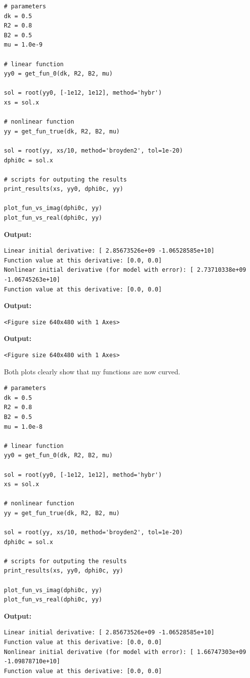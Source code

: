 \documentclass{article}
\begin{document}
\begin{lstlisting}
# parameters
dk = 0.5
R2 = 0.8
B2 = 0.5
mu = 1.0e-9

# linear function
yy0 = get_fun_0(dk, R2, B2, mu)

sol = root(yy0, [-1e12, 1e12], method='hybr')
xs = sol.x

# nonlinear function
yy = get_fun_true(dk, R2, B2, mu)

sol = root(yy, xs/10, method='broyden2', tol=1e-20)
dphi0c = sol.x

# scripts for outputing the results
print_results(xs, yy0, dphi0c, yy)

plot_fun_vs_imag(dphi0c, yy)
plot_fun_vs_real(dphi0c, yy)\end{lstlisting}

\textbf{Output:}\begin{verbatim}
Linear initial derivative: [ 2.85673526e+09 -1.06528585e+10]
Function value at this derivative: [0.0, 0.0]
Nonlinear initial derivative (for model with error): [ 2.73710338e+09 -1.06745263e+10]
Function value at this derivative: [0.0, 0.0]

\end{verbatim}

\textbf{Output:}\begin{verbatim}
<Figure size 640x480 with 1 Axes>
\end{verbatim}

\textbf{Output:}\begin{verbatim}
<Figure size 640x480 with 1 Axes>
\end{verbatim}

Both plots clearly show that my functions are now curved.

\begin{lstlisting}
# parameters
dk = 0.5
R2 = 0.8
B2 = 0.5
mu = 1.0e-8

# linear function
yy0 = get_fun_0(dk, R2, B2, mu)

sol = root(yy0, [-1e12, 1e12], method='hybr')
xs = sol.x

# nonlinear function
yy = get_fun_true(dk, R2, B2, mu)

sol = root(yy, xs/10, method='broyden2', tol=1e-20)
dphi0c = sol.x

# scripts for outputing the results
print_results(xs, yy0, dphi0c, yy)

plot_fun_vs_imag(dphi0c, yy)
plot_fun_vs_real(dphi0c, yy)\end{lstlisting}

\textbf{Output:}\begin{verbatim}
Linear initial derivative: [ 2.85673526e+09 -1.06528585e+10]
Function value at this derivative: [0.0, 0.0]
Nonlinear initial derivative (for model with error): [ 1.66747303e+09 -1.09878710e+10]
Function value at this derivative: [0.0, 0.0]

\end{verbatim}
\end{document}
